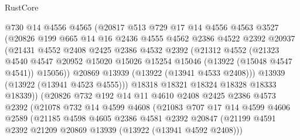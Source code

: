 \begin{lexlean}{RustCore}
\begin{coremodule}
                    @730
                    @14
                    @4556
                    @4565
                    (@20817
                      @513
                      @729
                      @17
                      @14
                      @4556
                      @4563
                      @3527
                      (@20826
                        @199
                        @665
                        @14
                        @16
                        @2436
                        @4555
                        @4562
                        @2386
                        @4522
                        @2392
                        @20937
                        (@21431
                          @4552
                          @2408
                          @2425
                          @2386
                          @4532
                          @2392
                          (@21312
                            @4552
                            (@21323
                              @4540
                              @4547
                              @20952
                              @15020
                              @15026
                              @15254
                              @15046
                              (@13922 (@15048 @4547 @4541))
                              @15056))
                          @20869
                          @13939
                          (@13922 (@13941 @4533 @2408)))
                        @13939
                        (@13922 (@13941 @4523 @4555)))
                      @18318
                      @18321
                      @18324
                      @18328
                      @18333
                      @18339))
                  (@20826
                    @732
                    @192
                    @14
                    @11
                    @4610
                    @2408
                    @2425
                    @2386
                    @4573
                    @2392
                    (@21078
                      @732
                      @14
                      @4599
                      @4608
                      (@21083
                        @707
                        @17
                        @14
                        @4599
                        @4606
                        @2589
                        (@21185
                          @4598
                          @4605
                          @2386
                          @4581
                          @2392
                          @20847
                          (@21199 @4591 @2392 @21209 @20869 @13939 (@13922 (@13941 @4592 @2408)))

\end{coremodule}
\end{lexlean}
